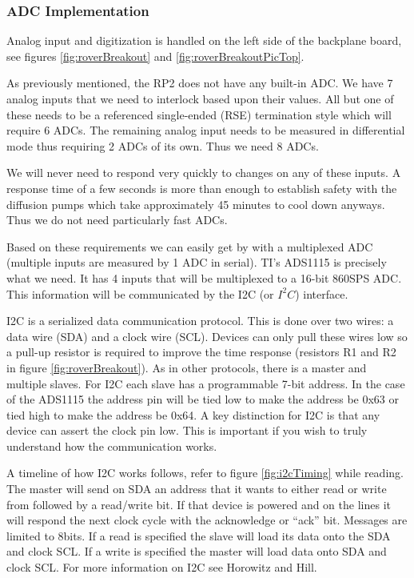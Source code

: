 \documentclass{article}
\begin{document}
\subsubsection{ADC Implementation}
Analog input and digitization is handled on the left side of the backplane board, see figures \ref{fig:roverBreakout} and \ref{fig:roverBreakoutPicTop}.

As previously mentioned, the RP2 does not have any built-in ADC. We have 7 analog inputs that we need to interlock based upon their values. All but one of these needs to be a referenced single-ended (RSE) termination style which will require 6 ADCs. The remaining analog input needs to be measured in differential mode thus requiring 2 ADCs of its own. Thus we need 8 ADCs.

We will never need to respond very quickly to changes on any of these inputs. A response time of a few seconds is more than enough to establish safety with the diffusion pumps which take approximately 45 minutes to cool down anyways. Thus we do not need particularly fast ADCs.

Based on these requirements we can easily get by with a multiplexed ADC (multiple inputs are measured by 1 ADC in serial). TI's ADS1115 is precisely what we need. It has 4 inputs that will be multiplexed to a 16-bit 860SPS ADC. This information will be communicated by the I2C (or $I^2C$) interface. 

I2C is a serialized data communication protocol. This is done over two wires: a data wire (SDA) and a clock wire (SCL). Devices can only pull these wires low so a pull-up resistor is required to improve the time response (resistors R1 and R2 in figure \ref{fig:roverBreakout}). As in other protocols, there is a master and multiple slaves. For I2C each slave has a programmable 7-bit address. In the case of the ADS1115 the address pin will be tied low to make the address be 0x63 or tied high to make the address be 0x64. A key distinction for I2C is that any device can assert the clock pin low. This is important if you wish to truly understand how the communication works.

A timeline of how I2C works follows, refer to figure \ref{fig:i2cTiming} while reading. The master will send on SDA an address that it wants to either read or write from followed by a read/write bit. If that device is powered and on the lines it will respond the next clock cycle with the acknowledge or ``ack'' bit. Messages are limited to 8bits. If a read is specified the slave will load its data onto the SDA and clock SCL. If a write is specified the master will load data onto SDA and clock SCL. For more information on I2C see Horowitz and Hill.
\end{document}

